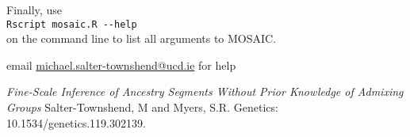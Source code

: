 \documentclass{article}
\begin{document}
Finally, use \\
\verb+Rscript mosaic.R --help+\\
on the command line to list all arguments to MOSAIC. 


email \url{michael.salter-townshend@ucd.ie} for help


\begin{thebibliography}{2}

    \textit{Fine-Scale Inference of Ancestry Segments Without Prior Knowledge of Admixing Groups}
{Salter-Townshend, M {\rm and} Myers, S.R.}
    Genetics: 10.1534/genetics.119.302139.

\end{thebibliography}
\end{document}
